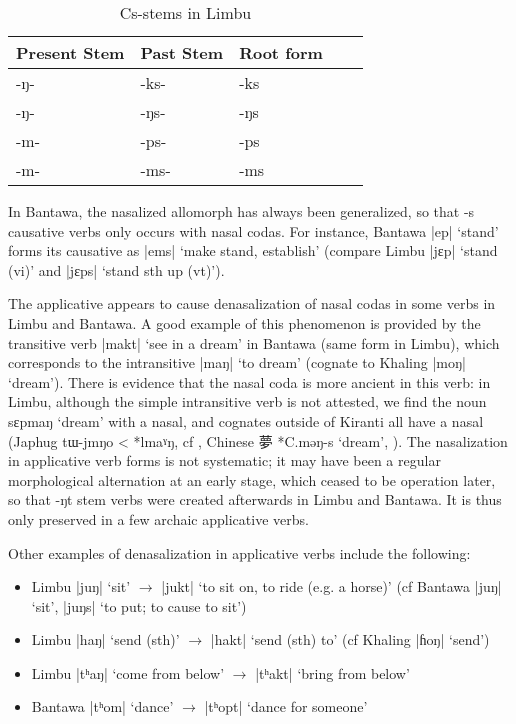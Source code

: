 \documentclass[oneside,a4paper,11pt]{article}
\newcommand{\ipa}[1]{{\phon\mbox{#1}}} %
\newcommand{\zh}[1]{{\cn #1}}
\newcommand{\dhatu}[2]{|\ipa{#1}| `#2'}
\begin{document}
\begin{table}[H]
\caption{Cs-stems in Limbu} \centering \label{tab:Cs.limbu}
\begin{tabular}{lllll}
\toprule
Present Stem & Past Stem & Root form \\
\midrule
\ipa{-ŋ-} & \ipa{-ks-} & \ipa{-ks} \\
\ipa{-ŋ-} & \ipa{-ŋs-} & \ipa{-ŋs} \\
\ipa{-m-} & \ipa{-ps-} & \ipa{-ps} \\
\ipa{-m-} & \ipa{-ms-} & \ipa{-ms} \\
\bottomrule
\end{tabular}
\end{table} 

In Bantawa, the nasalized allomorph has always been generalized, so that \ipa{-s} causative verbs only occurs with nasal codas. For instance, Bantawa \dhatu{ep}{stand} forms its causative as \dhatu{ems}{make stand, establish} (compare Limbu \dhatu{jɛp}{stand (vi)}  and \dhatu{jɛps}{stand sth up (vt)}).

The applicative appears to cause denasalization of nasal codas in some verbs in Limbu and Bantawa. A good example of this phenomenon is provided by the transitive verb \dhatu{makt}{see in a dream}	in Bantawa (same form in Limbu), which corresponds to the intransitive \dhatu{maŋ}{to dream} (cognate to Khaling \dhatu{moŋ}{dream}). There is evidence that the nasal coda is more ancient in this verb: in Limbu, although the simple intransitive verb is not attested, we find the noun \ipa{sɛpmaŋ} `dream' with a nasal, and cognates outside of Kiranti all have a nasal (Japhug \ipa{tɯ-jmŋo} < *\ipa{lmaˠŋ}, cf \citealt[44]{jacques04these}, Chinese \zh{夢} *\ipa{C.məŋ-s} `dream', \citealt{bs14oc}). The nasalization in applicative verb forms is not systematic; it may have been a regular morphological alternation at an early stage, which ceased to be operation later, so that \ipa{-ŋt} stem verbs were created afterwards in Limbu and Bantawa. It is thus only preserved in a few archaic applicative verbs.


Other examples of denasalization in applicative verbs include the following:

\begin{itemize}
\item Limbu \dhatu{juŋ}{sit} $\rightarrow $ \dhatu{jukt}{to sit on, to ride (e.g. a horse)} (cf Bantawa \dhatu{juŋ}{sit}, \dhatu{juŋs}{to put; to cause to sit})
\item Limbu \dhatu{haŋ}{send (sth)} $\rightarrow $ \dhatu{hakt}{send (sth) to} (cf Khaling \dhatu{ɦoŋ}{send})
\item Limbu \dhatu{tʰaŋ}{come from below} $\rightarrow $ \dhatu{tʰakt}{bring from below}
\item Bantawa \dhatu{tʰom}{dance} $\rightarrow $ \dhatu{tʰopt}{dance for someone}
\end{itemize}
 
\end{document}

